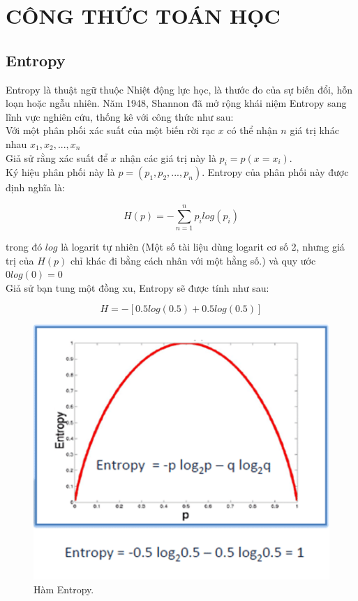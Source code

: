\chapter{CÔNG THỨC TOÁN HỌC}

\section{Entropy}
Entropy là thuật ngữ thuộc Nhiệt động lực học, là thước đo của sự biến đổi, hỗn loạn hoặc ngẫu nhiên. Năm 1948, Shannon đã mở rộng khái niệm Entropy sang lĩnh vực nghiên cứu, thống kê với công thức như sau:\\

Với một phân phối xác suất của một biến rời rạc $x$ có thể nhận $n$ giá trị khác nhau $x_1, x_2,..., x_n$\\

Giả sử rằng xác suất để $x$ nhận các giá trị này là $p_i=p(x=x_i)$.\\

Ký hiệu phân phối này là $p=(p_1, p_2,..., p_n)$. Entropy của phân phối này được định nghĩa là:

\begin{equation*}
    H(p)=-\sum_{n=1}^{n}p_ilog(p_i)
\end{equation*}

trong đó $log$ là logarit tự nhiên (Một số tài liệu dùng logarit cơ số 2, nhưng giá trị của $H(p)$ chỉ khác đi bằng cách nhân với một hằng số.) và quy ước $0log(0)=0$\\

Giả sử bạn tung một đồng xu, Entropy sẽ được tính như sau:

\begin{equation*}
    H = -[0.5log(0.5) + 0.5log(0.5)]
\end{equation*}

\begin{center}
    \begin{figure}[ht!]
        \begin{center}
         \includegraphics[scale=0.7]{chapter4/img/dt_ex2.png}
        \end{center}
        \caption{Hàm Entropy.}
        \label{fig:dt_ex2}
    \end{figure}
\end{center}

